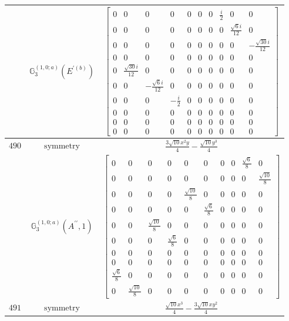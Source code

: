 \documentclass[fleqn,8pt,landscape]{jsarticle}
\begin{document}
\begin{longtable}{ccc}
$  $ & $ \mathbb{G}_{3}^{(1,0;a)}(E^{\prime(b)}) $ & $ \begin{bmatrix} 0 & 0 & 0 & 0 & 0 & 0 & 0 & \frac{i}{2} & 0 & 0 \\ 0 & 0 & 0 & 0 & 0 & 0 & 0 & 0 & \frac{\sqrt{6} i}{12} & 0 \\ 0 & 0 & 0 & 0 & 0 & 0 & 0 & 0 & 0 & - \frac{\sqrt{30} i}{12} \\ 0 & 0 & 0 & 0 & 0 & 0 & 0 & 0 & 0 & 0 \\ 0 & \frac{\sqrt{30} i}{12} & 0 & 0 & 0 & 0 & 0 & 0 & 0 & 0 \\ 0 & 0 & - \frac{\sqrt{6} i}{12} & 0 & 0 & 0 & 0 & 0 & 0 & 0 \\ 0 & 0 & 0 & - \frac{i}{2} & 0 & 0 & 0 & 0 & 0 & 0 \\ 0 & 0 & 0 & 0 & 0 & 0 & 0 & 0 & 0 & 0 \\ 0 & 0 & 0 & 0 & 0 & 0 & 0 & 0 & 0 & 0 \\ 0 & 0 & 0 & 0 & 0 & 0 & 0 & 0 & 0 & 0 \end{bmatrix} $ \\ \hline
$ 490 $ & $ \text{symmetry} $ & $ \frac{3 \sqrt{10} x^{2} y}{4} - \frac{\sqrt{10} y^{3}}{4} $ \\
$  $ & $ \mathbb{G}_{3}^{(1,0;a)}(A^{\prime\prime},1) $ & $ \begin{bmatrix} 0 & 0 & 0 & 0 & 0 & 0 & 0 & 0 & \frac{\sqrt{6}}{8} & 0 \\ 0 & 0 & 0 & 0 & 0 & 0 & 0 & 0 & 0 & \frac{\sqrt{10}}{8} \\ 0 & 0 & 0 & 0 & \frac{\sqrt{10}}{8} & 0 & 0 & 0 & 0 & 0 \\ 0 & 0 & 0 & 0 & 0 & \frac{\sqrt{6}}{8} & 0 & 0 & 0 & 0 \\ 0 & 0 & \frac{\sqrt{10}}{8} & 0 & 0 & 0 & 0 & 0 & 0 & 0 \\ 0 & 0 & 0 & \frac{\sqrt{6}}{8} & 0 & 0 & 0 & 0 & 0 & 0 \\ 0 & 0 & 0 & 0 & 0 & 0 & 0 & 0 & 0 & 0 \\ 0 & 0 & 0 & 0 & 0 & 0 & 0 & 0 & 0 & 0 \\ \frac{\sqrt{6}}{8} & 0 & 0 & 0 & 0 & 0 & 0 & 0 & 0 & 0 \\ 0 & \frac{\sqrt{10}}{8} & 0 & 0 & 0 & 0 & 0 & 0 & 0 & 0 \end{bmatrix} $ \\ \hline
$ 491 $ & $ \text{symmetry} $ & $ \frac{\sqrt{10} x^{3}}{4} - \frac{3 \sqrt{10} x y^{2}}{4} $ \\

\end{longtable}
\end{document}
